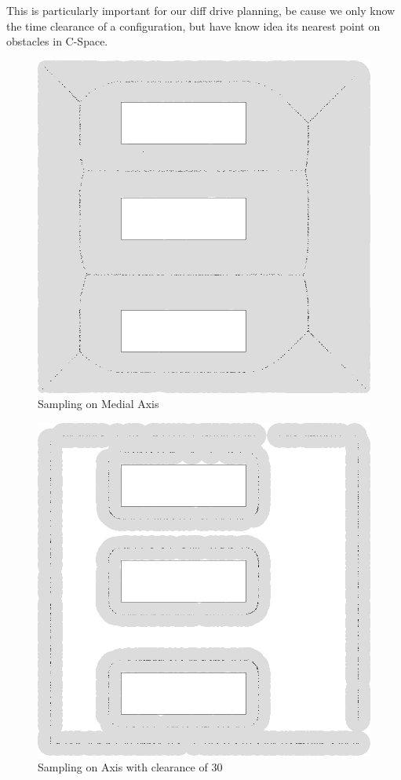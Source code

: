 \documentclass[12pt]{article}
\begin{document}
  This is particularly important for our diff drive planning, be cause we only know the time clearance of a configuration, but have know idea its nearest point on obstacles in C-Space. 
  
  \begin{figure}[p]
  \centering
  \includegraphics[scale=0.5]{MediaAxis_Cover.PNG}  
  \caption{Sampling on Medial Axis}   
  \label{fig:MA} 
  \end{figure}
  
  \begin{figure}[p]
  \centering
  \includegraphics[scale=0.5]{MediaAxis_cost_30.PNG}  
  \caption{Sampling on Axis with clearance of 30}   
  \label{fig:ISO} 
  \end{figure}
        
\end{document}
